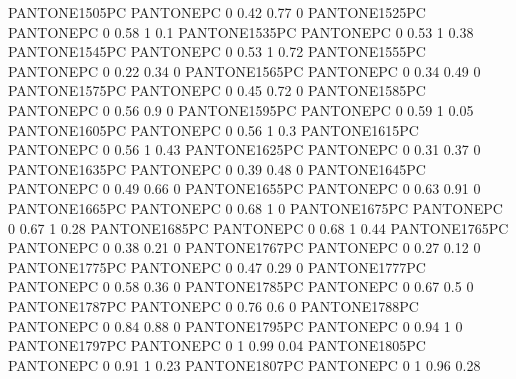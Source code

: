  {PANTONE1505PC} {PANTONE\SpotSpace PC} {0 0.42 0.77 0}
 {PANTONE1525PC} {PANTONE\SpotSpace PC} {0 0.58 1 0.1}
 {PANTONE1535PC} {PANTONE\SpotSpace PC} {0 0.53 1 0.38}
 {PANTONE1545PC} {PANTONE\SpotSpace PC} {0 0.53 1 0.72}
 {PANTONE1555PC} {PANTONE\SpotSpace PC} {0 0.22 0.34 0}
 {PANTONE1565PC} {PANTONE\SpotSpace PC} {0 0.34 0.49 0}
 {PANTONE1575PC} {PANTONE\SpotSpace PC} {0 0.45 0.72 0}
 {PANTONE1585PC} {PANTONE\SpotSpace PC} {0 0.56 0.9 0}
 {PANTONE1595PC} {PANTONE\SpotSpace PC} {0 0.59 1 0.05}
 {PANTONE1605PC} {PANTONE\SpotSpace PC} {0 0.56 1 0.3}
 {PANTONE1615PC} {PANTONE\SpotSpace PC} {0 0.56 1 0.43}
 {PANTONE1625PC} {PANTONE\SpotSpace PC} {0 0.31 0.37 0}
 {PANTONE1635PC} {PANTONE\SpotSpace PC} {0 0.39 0.48 0}
 {PANTONE1645PC} {PANTONE\SpotSpace PC} {0 0.49 0.66 0}
 {PANTONE1655PC} {PANTONE\SpotSpace PC} {0 0.63 0.91 0}
 {PANTONE1665PC} {PANTONE\SpotSpace PC} {0 0.68 1 0}
 {PANTONE1675PC} {PANTONE\SpotSpace PC} {0 0.67 1 0.28}
 {PANTONE1685PC} {PANTONE\SpotSpace PC} {0 0.68 1 0.44}
 {PANTONE1765PC} {PANTONE\SpotSpace PC} {0 0.38 0.21 0}
 {PANTONE1767PC} {PANTONE\SpotSpace PC} {0 0.27 0.12 0}
 {PANTONE1775PC} {PANTONE\SpotSpace PC} {0 0.47 0.29 0}
 {PANTONE1777PC} {PANTONE\SpotSpace PC} {0 0.58 0.36 0}
 {PANTONE1785PC} {PANTONE\SpotSpace PC} {0 0.67 0.5 0}
 {PANTONE1787PC} {PANTONE\SpotSpace PC} {0 0.76 0.6 0}
 {PANTONE1788PC} {PANTONE\SpotSpace PC} {0 0.84 0.88 0}
 {PANTONE1795PC} {PANTONE\SpotSpace PC} {0 0.94 1 0}
 {PANTONE1797PC} {PANTONE\SpotSpace PC} {0 1 0.99 0.04}
 {PANTONE1805PC} {PANTONE\SpotSpace PC} {0 0.91 1 0.23}
 {PANTONE1807PC} {PANTONE\SpotSpace PC} {0 1 0.96 0.28}
